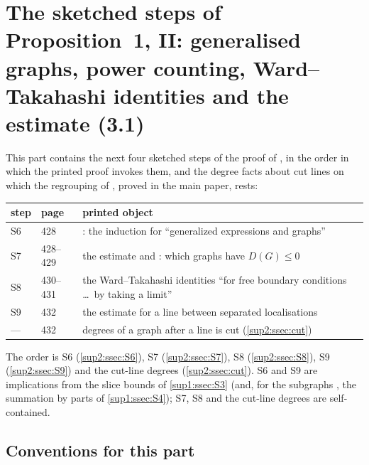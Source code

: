 
\section{The sketched steps of Proposition~1, II: generalised graphs, power counting, Ward--Takahashi identities and the estimate (3.1)}\label{sup2:sec}

This part contains the next four sketched steps of the proof of \cite[Prop.~1, (1.33)]{Ba3}, in the order in which the printed proof invokes them, and the degree facts about cut lines on which the regrouping of \cite[p.~432]{Ba3}, proved in the main paper, rests:

\begin{center}
\begin{tabular}{lll}
step & \cite{Ba3} page & printed object\\\hline
S6 & 428 & \cite[Prop.~2.2]{Ba3}: the induction \cite[(2.16)]{Ba3} for ``generalized expressions and graphs''\\
S7 & 428--429 & the estimate \cite[(2.17)]{Ba3} and \cite[Cor.~2.3]{Ba3}: which graphs have $D(G)\le0$\\
S8 & 430--431 & the Ward--Takahashi identities \cite[(2.23)--(2.28)]{Ba3} ``for free boundary conditions \dots\ by taking a limit''\\
S9 & 432 & the estimate \cite[(3.1)]{Ba3} for a line between separated localisations\\
--- & 432 & degrees of a graph after a line is cut (\cref{sup2:ssec:cut})
\end{tabular}
\end{center}

The order is S6 (\cref{sup2:ssec:S6}), S7 (\cref{sup2:ssec:S7}), S8 (\cref{sup2:ssec:S8}), S9 (\cref{sup2:ssec:S9}) and the cut-line degrees (\cref{sup2:ssec:cut}). S6 and S9 are implications from the slice bounds of \cref{sup1:ssec:S3} (and, for the subgraphs \cite[(2.4)]{Ba3}, the summation by parts of \cref{sup1:ssec:S4}); S7, S8 and the cut-line degrees are self-contained.

\subsection*{Conventions for this part}

